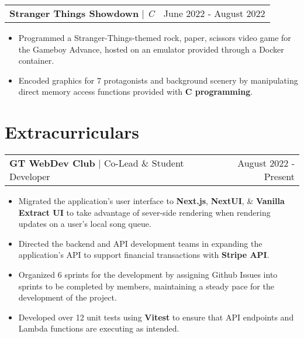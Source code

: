 \documentclass[letterpaper,11pt]{article}
\makeatletter
\newcommand{\resumeExperienceHeading}[3]{
    \begin{tabular*}{0.99\textwidth}[t]{l@{\extracolsep{\fill}}r}
      \textbf{#1} $\vert$ {#2} & {#3} \\
    \end{tabular*}\vspace{-3pt}
}
\newcommand{\resumeProjectHeading}[3]{
    \begin{tabular*}{0.97\textwidth}[t]{l@{\extracolsep{\fill}}r}
      \textbf{#1} $\vert$ \textit{#2}  & {#3}
    \end{tabular*}\vspace{-3pt}
}
\newcommand{\resumeItemListStart}{\begin{itemize}[noitemsep]\vspace{-4pt}}
\newcommand{\resumeItemListEnd}{\end{itemize}}
\makeatother
\begin{document}
    \resumeProjectHeading{Stranger Things Showdown}{C}{June 2022 - August 2022}
      \resumeItemListStart
        \item {Programmed a Stranger-Things-themed rock, paper, scissors video game for the Gameboy Advance, hosted on an emulator provided through a Docker container.}
        \item {Encoded graphics for 7 protagonists and background scenery by manipulating direct memory access functions provided with \textbf{C programming}.}
      \resumeItemListEnd

\section{Extracurriculars}
  \resumeExperienceHeading{GT WebDev Club}{Co-Lead \& Student Developer}{August 2022 - Present}
    \resumeItemListStart
      \item {Migrated the application's user interface to \textbf{Next.js}, \textbf{NextUI}, \& \textbf{Vanilla Extract UI} to take advantage of sever-side rendering when rendering updates on a user's local song queue.}
      \item {Directed the backend and API development teams in expanding the application's API to support financial transactions with \textbf{Stripe API}.}
      \item {Organized 6 sprints for the development by assigning Github Issues into sprints to be completed by members, maintaining a steady pace for the development of the project.}
      \item {Developed over 12 unit tests using \textbf{Vitest} to ensure that API endpoints and Lambda functions are executing as intended.}
    \resumeItemListEnd
\end{document}
